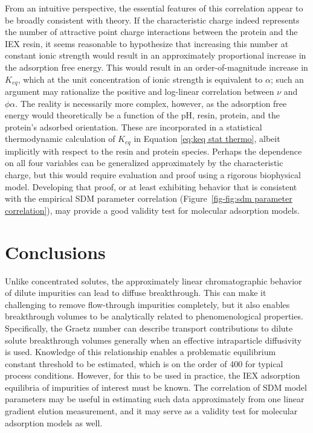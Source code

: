 \documentclass[preprint,review,12pt]{elsarticle}
\begin{document}
        From an intuitive perspective, the essential features of this correlation appear to be broadly consistent with theory. If the characteristic charge indeed represents the number of attractive point charge interactions between the protein and the IEX resin, it seems reasonable to hypothesize that increasing this number at constant ionic strength would result in an approximately proportional increase in the adsorption free energy. This would result in an order-of-magnitude increase in $K_{eq}$, which at the unit concentration of ionic strength is equivalent to $\alpha$; such an argument may rationalize the positive and log-linear correlation between $\nu$ and $\phi \alpha$. The reality is necessarily more complex, however, as the adsorption free energy would theoretically be a function of the pH, resin, protein, and the protein's adsorbed orientation.  These are incorporated in a statistical thermodynamic calculation of $K_{eq}$ in Equation \ref{eq:keq stat thermo}, albeit implicitly with respect to the resin and protein species. Perhaps the dependence on all four variables can be generalized approximately by the characteristic charge, but this would require evaluation and proof using a rigorous biophysical model. Developing that proof, or at least exhibiting behavior that is consistent with the empirical SDM parameter correlation (Figure~\ref{fig-fig:sdm parameter correlation}), may provide a good validity test for molecular adsorption models.

\section{Conclusions} \label{sec:concl}

    Unlike concentrated solutes, the approximately linear chromatographic behavior of dilute impurities can lead to diffuse breakthrough. This can make it challenging to remove flow-through impurities completely, but it also enables breakthrough volumes to be analytically related to phenomenological properties. Specifically, the Graetz number can describe transport contributions to dilute solute breakthrough volumes generally when an effective intraparticle diffusivity is used. Knowledge of this relationship enables a problematic equilibrium constant threshold to be estimated, which is on the order of 400 for typical process conditions. However, for this to be used in practice, the IEX adsorption equilibria of impurities of interest must be known. The correlation of SDM model parameters may be useful in estimating such data approximately from one linear gradient elution measurement, and it may serve as a validity test for molecular adsorption models as well.
\end{document}
